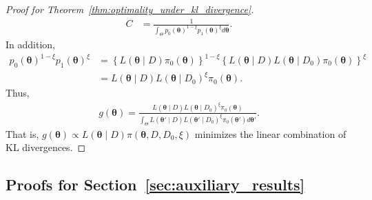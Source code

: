 \documentclass[12pt]{article}
\begin{document}
\begin{proof}[Proof for Theorem~\ref{thm:optimality_under_kl_divergence}]
\begin{align*}
        C &= \frac{1}{\int_\Theta p_0(\bm{\theta})^{1 - \xi}p_1(\bm{\theta})^\xi d\bm{\theta}}.
    \end{align*}
    In addition,
    \begin{align*}
        p_0(\bm{\theta})^{1 - \xi}p_1(\bm{\theta})^\xi &= \left\{L(\bm{\theta} \mid D)\pi_0(\bm{\theta})\right\}^{1 - \xi}\left\{L(\bm{\theta} \mid D)L(\bm{\theta} \mid D_0)\pi_0(\bm{\theta})\right\}^\xi \\
        &= L(\bm{\theta} \mid D) L(\bm{\theta} \mid D_0)^\xi \pi_0(\bm{\theta}).
    \end{align*}
    Thus,
    \begin{align*}
        g(\bm{\theta}) = \frac{L(\bm{\theta} \mid D) L(\bm{\theta} \mid D_0)^\xi \pi_0(\bm{\theta})}{\int_\Theta L(\bm{\theta'} \mid D) L(\bm{\theta'} \mid D_0)^\xi \pi_0(\bm{\theta'})d\bm{\theta}'}.
    \end{align*}
    That is, $g(\bm{\theta}) \propto L(\bm{\theta} \mid D)\pi(\bm{\theta}, D, D_0, \xi)$ minimizes the linear combination of KL divergences.
\end{proof}

\clearpage

\subsection{Proofs for Section~\ref{sec:auxiliary_results}}
\end{document}
